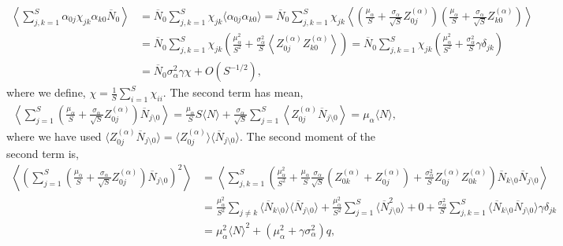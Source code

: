 \documentclass[10pt]{article}
\begin{document}
\begin{align}
	\left\langle
		\sum_{j,k=1}^S \alpha_{0j}\chi_{jk}\alpha_{k0} \overline{N}_0
	\right\rangle
	\nonumber
	&=
	\overline{N}_0
	\sum_{j,k=1}^S
	\chi_{jk}
	\langle\alpha_{0j} \alpha_{k0}\rangle
	=
	\overline{N}_0
	\sum_{j,k=1}^S
	\chi_{jk}
	\left\langle
		(\frac{\mu_\alpha}{S} + \frac{\sigma_\alpha}{\sqrt{S} }Z_{0j}^{(\alpha)})
		(\frac{\mu_\alpha}{S} + \frac{\sigma_\alpha}{\sqrt{S} }Z_{k0}^{(\alpha)})
	\right\rangle
	\\
	&=
	\overline{N}_0
	\sum_{j,k=1}^S
	\chi_{jk}
	\left(
		\frac{\mu_\alpha^2}{S^2}
		+
		\frac{\sigma_\alpha^2}{S}
		\left\langle
			Z_{0j}^{(\alpha)}Z_{k0}^{(\alpha)}
		\right\rangle
	\right)
	=
	\overline{N}_0
	\sum_{j,k=1}^S
	\chi_{jk}
	\left(
		\frac{\mu_\alpha^2}{S^2}
		+
		\frac{\sigma_\alpha^2}{S}
		\gamma \delta_{jk}
	\right)
	\nonumber
	\\
	&=
	\overline{N}_0
	\sigma_\alpha^2
	\gamma
	\chi
	+
	O(S^{-1/2}),
\end{align}
where we define, $\chi = \frac{1}{S} \sum_{i=1}^S \chi_{ii}$.
The second term has mean,
\begin{align}
	\left\langle
		\sum_{j=1}^S \left(
			\frac{\mu_\alpha}{S}
			+
			\frac{\sigma_\alpha}{\sqrt{S}} Z_{0j}^{(\alpha)}
		\right) \overline{N}_{j\setminus 0}
	\right\rangle
	=
	\frac{\mu_\alpha}{S} S \langle N\rangle
	+
	\frac{\sigma_\alpha}{\sqrt{S}}\sum_{j=1}^S \left\langle Z_{0j}^{(\alpha)} \overline{N}_{j \setminus 0}\right\rangle
	=
	\mu_\alpha \langle N\rangle,
\end{align}
where we have used $\langle Z_{0j}^{(\alpha)} \overline N_{j\setminus 0}\rangle 
=
\langle Z_{0j}^{(\alpha)}\rangle \langle \overline N_{j\setminus 0}\rangle
$.
The second moment of the second term is,
\begin{align}
	\left\langle
		\left(
			\sum_{j=1}^S \left(
				\frac{\mu_\alpha}{S}
				+
				\frac{\sigma_\alpha}{\sqrt{S}} Z_{0j}^{(\alpha)}
			\right) \overline{N}_{j\setminus 0}
		\right)^2
	\right\rangle
	&=
	\left\langle
			\sum_{j,k=1}^S \left(
					\frac{\mu_\alpha^2}{S^2}
					+
					\frac{\mu_\alpha}{S}
					\frac{\sigma_\alpha}{\sqrt{S}} (Z_{0k}^{(\alpha)}+Z_{0j}^{(\alpha)})
					+
					\frac{\sigma_\alpha^2}{S} 
					Z_{0j}^{(\alpha)}
					Z_{0k}^{(\alpha)}
			\right)
			\overline{N}_{k\setminus 0} \overline{N}_{j\setminus 0}
	\right\rangle
	\nonumber
	\\
	&=
	\frac{\mu_\alpha^2}{S^2}\sum_{j \ne k}\langle\overline{N}_{k \setminus 0}\rangle\langle\overline{N}_{j \setminus 0}\rangle
	+
	\frac{\mu_\alpha^2}{S^2}
	\sum_{j = 1}^S\langle \overline{N}_{j \setminus 0}^2 \rangle
	+ 0 + 
	\frac{\sigma_\alpha^2}{S}\sum_{j,k=1}^S\langle \overline{N}_{k \setminus 0}\overline{N}_{j \setminus 0}\rangle\gamma \delta_{jk}
	\nonumber
	\\
	&=
	\mu_\alpha^2 \langle N \rangle^2
	+
	(\mu_\alpha^2 
	+
	\gamma
	\sigma_\alpha^2) q
	,
\end{align}
\end{document}
